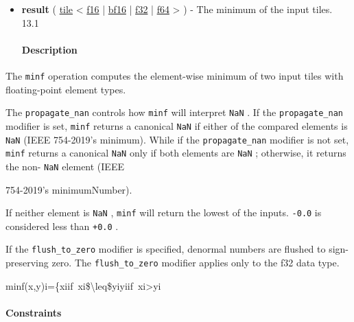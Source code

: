 \documentclass{article}
\begin{document}
\begin{itemize}
\item \textbf{result} ( \href{https://docs.nvidia.com/cuda/tile-ir/latest/sections/types.html#type-tile}{tile} < \href{https://docs.nvidia.com/cuda/tile-ir/latest/sections/types.html#subsection-element-types}{f16} | \href{https://docs.nvidia.com/cuda/tile-ir/latest/sections/types.html#subsection-element-types}{bf16} | \href{https://docs.nvidia.com/cuda/tile-ir/latest/sections/types.html#subsection-element-types}{f32} | \href{https://docs.nvidia.com/cuda/tile-ir/latest/sections/types.html#subsection-element-types}{f64} > ) - The minimum of the input tiles. 13.1


\paragraph{Description}

\end{itemize}
The \texttt{minf} operation computes the element-wise minimum of two input tiles with floating-point element types.


The \texttt{propagate\_nan} controls how \texttt{minf} will interpret \texttt{NaN} . If the \texttt{propagate\_nan} modifier is set, \texttt{minf} returns a canonical \texttt{NaN} if either of the compared elements is \texttt{NaN} (IEEE 754-2019's minimum). While if the \texttt{propagate\_nan} modifier is not set, \texttt{minf} returns a canonical \texttt{NaN} only if both elements are \texttt{NaN} ; otherwise, it returns the non- \texttt{NaN} element (IEEE

754-2019's minimumNumber).


If neither element is \texttt{NaN} , \texttt{minf} will return the lowest of the inputs. \texttt{-0.0} is considered less than \texttt{+0.0} .


If the \texttt{flush\_to\_zero} modifier is specified, denormal numbers are flushed to sign-preserving zero. The \texttt{flush\_to\_zero} modifier applies only to the f32 data type.


minf(x,y)i=\{xiif xi\$\textbackslash{}leq\$yiyiif xi>yi


\paragraph{Constraints}
\end{document}
